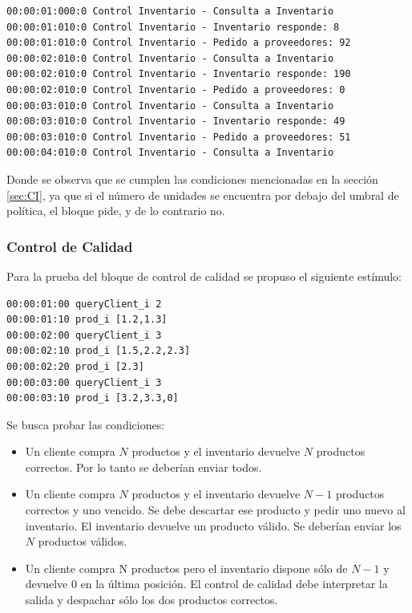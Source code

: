 \documentclass[10pt]{article}
\begin{document}
\begin{minipage}{1\textwidth}
	\centering
	\begin{lstlisting}
00:00:01:000:0 Control Inventario - Consulta a Inventario
00:00:01:010:0 Control Inventario - Inventario responde: 8
00:00:01:010:0 Control Inventario - Pedido a proveedores: 92
00:00:02:010:0 Control Inventario - Consulta a Inventario
00:00:02:010:0 Control Inventario - Inventario responde: 190
00:00:02:010:0 Control Inventario - Pedido a proveedores: 0
00:00:03:010:0 Control Inventario - Consulta a Inventario
00:00:03:010:0 Control Inventario - Inventario responde: 49
00:00:03:010:0 Control Inventario - Pedido a proveedores: 51
00:00:04:010:0 Control Inventario - Consulta a Inventario
	\end{lstlisting}
	
\end{minipage}
Donde se observa que se cumplen las condiciones mencionadas en la sección \ref{sec:CI}, ya que si el número de unidades se encuentra por debajo del umbral de política, el bloque pide, y de lo contrario no. 

\subsubsection{Control de Calidad}
Para la prueba del bloque de control de calidad se propuso el siguiente estímulo:

\begin{minipage}{1\textwidth}
	\centering
	\begin{lstlisting}
00:00:01:00 queryClient_i 2
00:00:01:10 prod_i [1.2,1.3]
00:00:02:00 queryClient_i 3
00:00:02:10 prod_i [1.5,2.2,2.3]
00:00:02:20 prod_i [2.3]
00:00:03:00 queryClient_i 3
00:00:03:10 prod_i [3.2,3.3,0]
	\end{lstlisting}
\end{minipage}

Se busca probar las condiciones:
\begin{itemize}
	\item Un cliente compra $N$ productos y el inventario devuelve $N$ productos correctos. Por lo tanto se deberían enviar todos.
	\item Un cliente compra $N$ productos y el inventario devuelve $N-1$ productos correctos y uno vencido. Se debe descartar ese producto y pedir uno nuevo al inventario. El inventario devuelve un producto válido. Se deberían enviar los $N$ productos válidos.
	\item Un cliente compra N productos pero el inventario dispone sólo de $N-1$ y devuelve $0$ en la última posición. El control de calidad debe interpretar la salida y despachar sólo los dos productos correctos.
\end{itemize}
\end{document}

